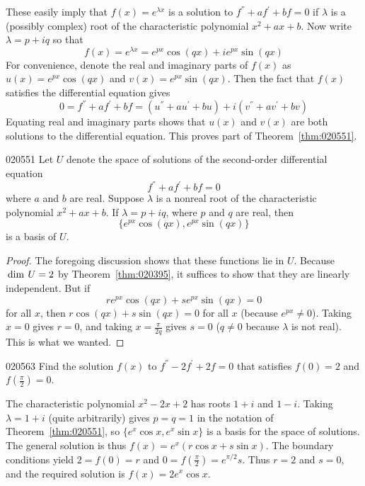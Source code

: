 \noindent These easily imply that $f(x) = e^{\lambda x}$ is a solution to $f^\dprime + af^\prime + bf = 0$ if $\lambda$ is a (possibly complex) root of the characteristic polynomial $x^{2} + ax + b$. Now write $\lambda = p + iq$ so that
\begin{equation*}
f(x) = e^{\lambda x} = e^{px} \cos(qx) + ie^{px} \sin(qx)
\end{equation*}
For convenience, denote the real and imaginary parts of $f(x)$ as $u(x) = e^{px} \cos(qx)$ and $v(x) = e^{px} \sin(qx)$. Then the fact that $f(x)$ satisfies the differential equation gives
\begin{equation*}
0 = f^\dprime + af^\prime + bf = (u^\dprime + au^\prime + bu) + i(v^\dprime + av^\prime + bv)
\end{equation*}
Equating real and imaginary parts shows that $u(x)$ and $v(x)$ are both solutions to the differential equation. This proves part of Theorem~\ref{thm:020551}.

\begin{theorem}{}{020551}
Let $U$ denote the space of solutions of the second-order differential equation
\begin{equation*}
f^\dprime + af^\prime + bf = 0
\end{equation*}
where $a$ and $b$ are real. Suppose $\lambda$ is a nonreal root of the characteristic polynomial $x^{2} + ax + b$. If $\lambda = p + iq$, where $p$ and $q$ are real, then
\begin{equation*}
\{e^{px}\cos(qx), e^{px}\sin(qx) \}
\end{equation*}
is a basis of $U$.
\end{theorem}

\begin{proof}
The foregoing discussion shows that these functions lie in $U$. Because $\thinspace\operatorname{dim\medspace} U = 2$ by Theorem~\ref{thm:020395}, it suffices to show that they are linearly independent. But if
\begin{equation*}
re^{px} \cos(qx) + se^{px} \sin(qx) = 0
\end{equation*}
for all $x$, then $r \cos(qx) + s \sin(qx) = 0$ for all $x$ (because $e^{px} \neq 0$). Taking $x = 0$ gives $r = 0$, and taking $x = \frac{\pi}{2q}$ gives $s = 0$ ($q \neq 0$ because $\lambda$ is not real). This is what we wanted.
\end{proof}

\begin{example}{}{020563}
Find the solution $f(x)$ to $f^\dprime - 2f^\prime + 2f = 0$ that satisfies $f(0) = 2$ and $f(\frac{\pi}{2}) = 0$.

\begin{solution}
The characteristic polynomial $x^{2} - 2x + 2$ has roots $1 + i$ and $1 - i$. Taking $\lambda = 1 + i$ (quite arbitrarily) gives $p = q = 1$ in the notation of Theorem~\ref{thm:020551}, so $\{e^{x} \cos x, e^{x} \sin x\}$ is a basis for the space of solutions. The general solution is thus $f(x) = e^{x}(r \cos x + s \sin x)$. The boundary conditions yield $2 = f(0) = r$ and $0 = f(\frac{\pi}{2}) = e^{\pi/2}s$. Thus $r = 2$ and $s = 0$, and the required solution is $f(x) = 2e^{x} \cos x$.
\end{solution}
\end{example}

